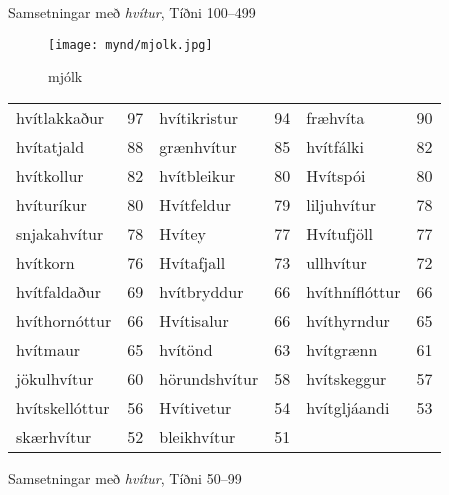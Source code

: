 \documentclass{../litmal.tex}{subfiles}
\begin{document}
\begin{wordlist}[H]
\begin{tcolorbox}
\end{tcolorbox}
	\caption{Samsetningar með \textit{hvítur}, Tíðni 100--499}
	\label{listi:hvitt.100}
\end{wordlist}

\begin{figure}[H]
\begin{tcolorbox}
\centering
	\texttt{[image: mynd/mjolk.jpg]}
\end{tcolorbox}
	\caption{mjólk}
	\label{mynd:mjolk}
\end{figure}

\begin{wordlist}[H]
\begin{tcolorbox}

	\setlength{\extrarowheight}{3pt}
	\begin{tabular}{BlBlBl}
		hvítlakkaður	& 97		& 
		hvítikristur	& 94		& 
		fræhvíta		& 90		\\ 
		hvítatjald	& 88		& 
		grænhvítur	& 85		& 
		hvítfálki		& 82		\\ 
		hvítkollur	& 82		& 
		hvítbleikur	& 80		& 
		Hvítspói		& 80		\\ 
		hvíturíkur	& 80		& 
		Hvítfeldur	& 79 		& 
		liljuhvítur	& 78		\\ 
		snjakahvítur	& 78		& 
		Hvítey		& 77		& 	
		Hvítufjöll	& 77		\\ 
		hvítkorn		& 76		& 
		Hvítafjall		& 73		& 
		ullhvítur		& 72		\\ 
		hvítfaldaður	& 69		& 
		hvítbryddur	& 66		& 	
		hvíthníflóttur	& 66		\\ 
		hvíthornóttur	& 66		& 
		Hvítisalur	& 66		& 
		hvíthyrndur	& 65		\\ 	
		hvítmaur		& 65		& 
		hvítönd		& 63		& 
		hvítgrænn	& 61		\\ 
		jökulhvítur	& 60		& 
		hörundshvítur & 58		& 
		hvítskeggur	& 57		\\ 
		hvítskellóttur	& 56		& 
		Hvítivetur	& 54		& 
		hvítgljáandi	& 53		\\ 	
		skærhvítur	& 52		& 
		bleikhvítur	& 51		& 	
					&
	\end{tabular}

\end{tcolorbox}
	\caption{Samsetningar með \textit{hvítur}, Tíðni 50--99}
	\label{listi:hvitt.50}
\end{wordlist}
\end{document}
